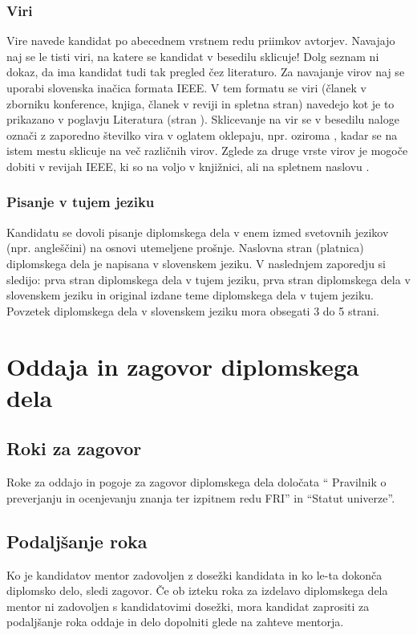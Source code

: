 \documentclass[12pt,a4paper,openany]{book}
\begin{document}
\subsection{Viri}
Vire navede kandidat po abecednem vrstnem redu priimkov avtorjev. Navajajo naj se le tisti viri, na katere se
kandidat v besedilu sklicuje! Dolg seznam ni dokaz, da ima kandidat tudi tak pregled čez literaturo. Za navajanje virov naj se uporabi
slovenska inačica formata IEEE. V tem formatu se viri (članek v zborniku konference,  knjiga, članek v reviji in spletna stran) navedejo  kot
je to prikazano v poglavju Literatura (stran \pageref{stran_literatura}). Sklicevanje na vir se v besedilu naloge označi z zaporedno številko
vira v oglatem oklepaju, npr. \cite{peytonjones93} oziroma \cite{trucco98,wadler89,IEEE}, kadar se na istem mestu sklicuje na več
različnih virov.  Zglede za druge vrste virov je mogoče dobiti v revijah IEEE, ki so na voljo v knjižnici, ali na spletnem naslovu
\cite{IEEE}.

\subsection{Pisanje v tujem jeziku}
Kandidatu se dovoli pisanje diplomskega dela v enem izmed svetovnih jezikov (npr. angleščini) na osnovi utemeljene prošnje. Naslovna stran
(platnica) diplomskega dela je napisana v slovenskem jeziku. V naslednjem zaporedju si sledijo: prva stran diplomskega dela v tujem jeziku,
prva stran diplomskega dela v slovenskem jeziku in original izdane teme diplomskega dela v tujem jeziku. Povzetek diplomskega dela v slovenskem
jeziku mora obsegati 3 do 5 strani. 


\chapter{Oddaja in zagovor diplomskega dela}

\section{Roki za zagovor}
Roke za oddajo in pogoje za zagovor diplomskega dela določata ``
Pravilnik o preverjanju in ocenjevanju znanja ter izpitnem redu FRI''
in ``Statut univerze''.

\section{Podalj\v sanje roka}
Ko je kandidatov mentor zadovoljen z dosežki kandidata in ko le-ta do\-kon\-ča diplomsko delo, sledi zagovor. Če ob izteku roka za izdelavo
diplomskega dela mentor ni zadovoljen s kandidatovimi dosežki, mora kandidat zaprositi za podaljšanje roka oddaje in delo dopolniti glede na
zahteve mentorja.
\end{document}
